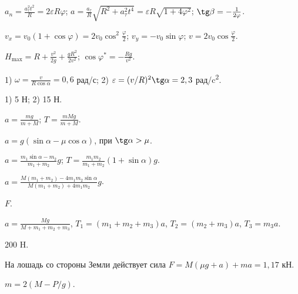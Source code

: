 \begin{Answer}{67}
$a_n = \frac{a_{\tau}^2 t^2}{R} = 2 \varepsilon R \varphi$; $a = \frac{a_{\tau}}{R} \sqrt{R^2 + a_{\tau}^2 t^4} = \varepsilon R \sqrt{1 + 4 \varphi^2}$; $\tg \beta = -\frac{1}{2\varphi}$.
\end{Answer}
\begin{Answer}{68}
$v_x = v_0 (1 + \cos \varphi) = 2v_0 \cos^2 \frac{\varphi}{2}$; $v_y = -v_0 \sin \varphi$; $v = 2v_0 \cos \frac{\varphi}{2}$.
\end{Answer}
\begin{Answer}{69}
$H_{\max} = R + \frac{v^2}{2g} + \frac{gR^2}{2v^2}$; $\cos \varphi^{*} = - \frac{Rg}{v^2}$.
\end{Answer}
\begin{Answer}{70}
1) $\omega = \frac{v}{R \cos \alpha} = 0,6$ рад/с; 2) $\varepsilon = (v/R)^2 \tg \alpha = 2,3$ рад/c\textsuperscript{2}.
\end{Answer}
\begin{Answer}{71}
1) 5 Н; 2) 15 Н.
\end{Answer}
\begin{Answer}{72}
$a = \frac{mg}{m+M}$; $T = \frac{mMg}{m+M}$.
\end{Answer}
\begin{Answer}{73}
$a = g (\sin \alpha - \mu \cos \alpha)$, при $\tg \alpha > \mu$.
\end{Answer}
\begin{Answer}{74}
$a = \frac{m_1 \sin \alpha - m_2}{m_1 + m_2}g$; $T = \frac{m_1 m_2}{m_1 + m_2}\left( 1+ \sin \alpha \right)g$.
\end{Answer}
\begin{Answer}{75}
$a = \frac{M(m_1 + m_2) - 4 m_1 m_2 \sin \alpha}{M(m_1 + m_2) + 4 m_1 m_2}g$.
\end{Answer}
\begin{Answer}{77}
$F$.
\end{Answer}
\begin{Answer}{82}
$a = \frac{Mg}{M + m_1 +m_2 +m_3}$, $T_1 = (m_1 +m_2 +m_3)a$, $T_2 = (m_2 +m_3)a$, $T_3 = m_3 a$.
\end{Answer}
\begin{Answer}{83}
200 H.
\end{Answer}
\begin{Answer}{85}
На лошадь со стороны Земли действует сила $F = M(\mu g + a) + ma = 1,17$ кН.
\end{Answer}
\begin{Answer}{86}
$m = 2(M - P/g)$.
\end{Answer}
